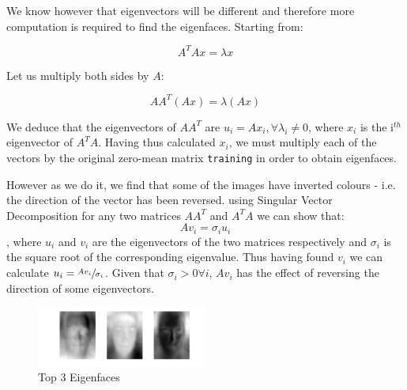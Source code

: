 \documentclass[10pt,twocolumn,letterpaper]{article}
\begin{document}
We know however that eigenvectors will be different and therefore more computation is required to find the eigenfaces. Starting from:

\begin{equation}
A^TAx = \lambda x
\end{equation}

Let us multiply both sides by $A$:

\begin{equation}
AA^T(Ax) = \lambda (Ax)
\end{equation}

We deduce that the eigenvectors of $AA^T$ are $u_i = Ax_i, \forall \lambda_i \neq 0$, where $x_i$ is the i$^{th}$ eigenvector of $A^TA$. Having thus calculated $x_i$, we must multiply each of the vectors by the original zero-mean matrix {\tt\small training} in order to obtain eigenfaces.

However as we do it, we find that some of the images have inverted colours - i.e. the direction of the vector has been reversed. using Singular Vector Decomposition for any two matrices $AA^T$ and $A^TA$ we can show that:
\begin{equation}
Av_i = \sigma_i u_i
\end{equation}
, where $u_i$ and $v_i$ are the eigenvectors of the two matrices respectively and $\sigma_i$ is the square root of the corresponding eigenvalue. Thus having found $v_i$ we can calculate $u_i = \sfrac{Av_i}{\sigma_i}$. Given that $\sigma_i > 0  \forall i$, $Av_i$ has the effect of reversing the direction of some eigenvectors.

\begin{figure}[H]
\centering
\includegraphics[width=0.5\textwidth]{../results/Q1B_PCA_Eigenfaces}

  \caption{Top 3 Eigenfaces \label{fig:Eig4}}

\end{figure}
\end{document}

